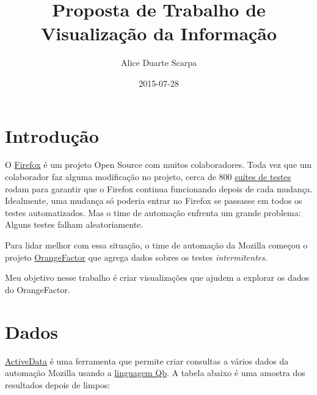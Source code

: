 \documentclass[11pt]{article}
\author{Alice Duarte Scarpa}
\date{2015-07-28}
\title{Proposta de Trabalho de Visualização da Informação}
\begin{document}
\maketitle

\section{Introdução}
\label{sec-1}

O \href{https://www.mozilla.org/en-US/firefox/new/}{Firefox} é um projeto Open Source com muitos colaboradores. Toda vez
que um colaborador faz alguma modificação no projeto, cerca de 800
\href{https://treeherder.mozilla.org/#/jobs?repo=mozilla-inbound}{suítes de testes} rodam para garantir que o Firefox continua
funcionando depois de cada mudança. Idealmente, uma mudança só poderia
entrar no Firefox se passasse em todos os testes automatizados. Mas o
time de automação enfrenta um grande problema: Alguns testes falham
aleatoriamente.

Para lidar melhor com essa situação, o time de automação da Mozilla
começou o projeto \href{http://brasstacks.mozilla.com/orangefactor/}{OrangeFactor} que agrega dados sobres os testes
\emph{intermitentes}.

Meu objetivo nesse trabalho é criar visualizações que ajudem a
explorar os dados do OrangeFactor.

\section{Dados}
\label{sec-2}

\href{http://activedata.allizom.org/tools/query.html}{ActiveData} é uma ferramenta que permite criar consultas a vários dados
da automação Mozilla usando a \href{https://github.com/klahnakoski/ActiveData/blob/dev/docs/Qb_Expressions.md}{linguagem Qb}. A tabela abaixo é uma
amostra dos resultados depois de limpos:
\end{document}
